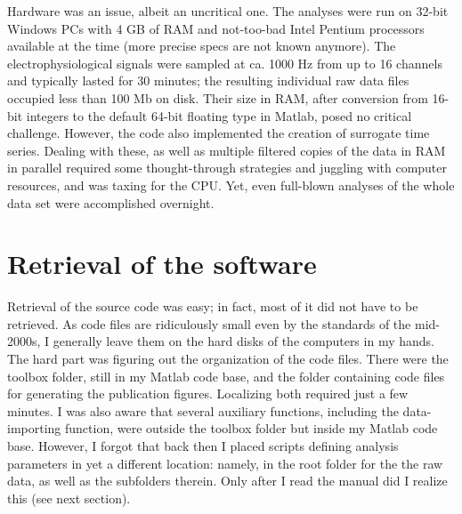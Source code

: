 Hardware was an issue, albeit an uncritical one. The analyses were run on 32-bit Windows PCs with 4 GB of RAM and not-too-bad Intel Pentium processors available at the time (more precise specs are not known anymore). The electrophysiological signals were sampled at ca. 1000 Hz from up to 16 channels and typically lasted for 30 minutes; the resulting individual raw data files occupied less than 100 Mb on disk. Their size in RAM, after conversion from 16-bit integers to the default 64-bit floating type in Matlab, posed no critical challenge. However, the code also implemented the creation of surrogate time series. Dealing with these, as well as multiple filtered copies of the data in RAM in parallel required some thought-through strategies and juggling with computer resources, and was taxing for the CPU. Yet, even full-blown analyses of the whole data set were accomplished overnight.


\section{Retrieval of the software}

Retrieval of the source code was easy; in fact, most of it did not have to be retrieved. As code files are ridiculously small even by the standards of the mid-2000s, I generally leave them on the hard disks of the computers in my hands. The hard part was figuring out the organization of the code files. There were the toolbox folder, still in my Matlab code base, and the folder containing code files for generating the publication figures. Localizing both required just a few minutes. I was also aware that several auxiliary functions, including the data-importing function, were outside the toolbox folder but inside my Matlab code base. However, I forgot that back then I placed scripts defining analysis parameters in yet a different location: namely, in the root folder for the the raw data, as well as the subfolders therein. Only after I read the manual did I realize this (see next section).

